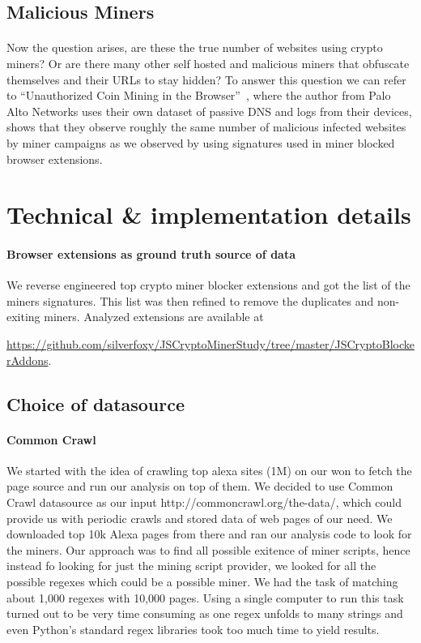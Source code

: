 \documentclass[letterpaper]{scrartcl} %
\numberwithin{equation}{section} %
\numberwithin{figure}{section} %
\numberwithin{table}{section} %
\begin{document}
\subsection{Malicious Miners}
\paragraph{}
Now the question arises, are these the true number of websites using crypto miners? Or are there many other self hosted and malicious miners that obfuscate themselves and their URLs to stay hidden? To answer this question we can refer to ``Unauthorized Coin Mining in the Browser''~\cite{ref:pan-mining}, where the author from Palo Alto Networks uses their own dataset of passive DNS and logs from their devices, shows that they observe roughly the same number of malicious infected websites by miner campaigns as we observed by using signatures used in miner blocked browser extensions.

\section{Technical \& implementation details}
\paragraph{\textbf{Browser extensions as ground truth source of data}}
We reverse engineered top crypto miner blocker extensions and got the list of the miners signatures.
This list was then refined to remove the duplicates and non-exiting miners. Analyzed extensions are available at

 \href{https://github.com/silverfoxy/JSCryptoMinerStudy/tree/master/JSCryptoBlockerAddons}{https://github.com/silverfoxy/JSCryptoMinerStudy/tree/master/JSCryptoBlockerAddons}.

\subsection{Choice of datasource}
\paragraph{\textbf{Common Crawl}}
We started with the idea of crawling top alexa sites (1M) on our won to fetch the page source and run
our analysis on top of them. We decided to use Common Crawl datasource as our input http://commoncrawl.org/the-data/, which could provide us with
periodic crawls and stored data of web pages of our need. We downloaded top 10k Alexa pages from there
and ran our analysis code to look for the miners. Our approach was to find all possible exitence of miner
scripts, hence instead fo looking for just the mining script provider, we looked for all the possible regexes
which could be a possible miner. We had the task of matching about 1,000 regexes with 10,000 pages. Using a
single computer to run this task turned out to be very time consuming as one regex unfolds to many
strings and even Python's standard regex libraries took too much time to yield results.
\end{document}

